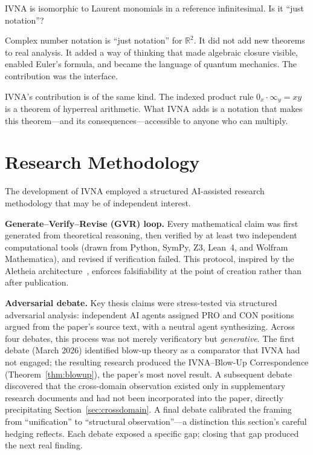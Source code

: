 \documentclass[12pt]{article}
\theoremstyle{definition}
\theoremstyle{remark}
\newcommand{\vz}[1]{0_{#1}}             %
\newcommand{\vi}[1]{\infty_{#1}}        %
\newcommand{\R}{\mathbb{R}}
\begin{document}
IVNA is isomorphic to Laurent monomials in a reference infinitesimal.
Is it ``just notation''?

Complex number notation is ``just notation'' for $\R^2$. It did not add
new theorems to real analysis. It added a way of thinking that made
algebraic closure visible, enabled Euler's formula, and became the
language of quantum mechanics. The contribution was the interface.

IVNA's contribution is of the same kind. The indexed product rule
$\vz{x} \cdot \vi{y} = xy$ is a theorem of hyperreal arithmetic.
What IVNA adds is a notation that makes this theorem---and its
consequences---accessible to anyone who can multiply.


\section{Research Methodology}
\label{sec:methodology}

The development of IVNA employed a structured AI-assisted research
methodology that may be of independent interest.

\textbf{Generate--Verify--Revise (GVR) loop.} Every mathematical
claim was first generated from theoretical reasoning, then verified
by at least two independent computational tools (drawn from Python,
SymPy, Z3, Lean~4, and Wolfram Mathematica), and revised if
verification failed. This protocol, inspired by the Aletheia
architecture~\cite{feng2026aletheia}, enforces falsifiability at the
point of creation rather than after publication.

\textbf{Adversarial debate.} Key thesis claims were stress-tested
via structured adversarial analysis: independent AI agents assigned
PRO and CON positions argued from the paper's source text, with a
neutral agent synthesizing. Across four debates, this process was
not merely verificatory but \emph{generative}. The first debate
(March 2026) identified blow-up theory as a comparator that IVNA
had not engaged; the resulting research produced the IVNA--Blow-Up
Correspondence (Theorem~\ref{thm:blowup}), the paper's most novel
result. A subsequent debate discovered that the cross-domain
observation existed only in supplementary research documents and
had not been incorporated into the paper, directly precipitating
Section~\ref{sec:crossdomain}. A final debate calibrated the
framing from ``unification'' to ``structural observation''---a
distinction this section's careful hedging reflects. Each debate
exposed a specific gap; closing that gap produced the next real
finding.
\end{document}
